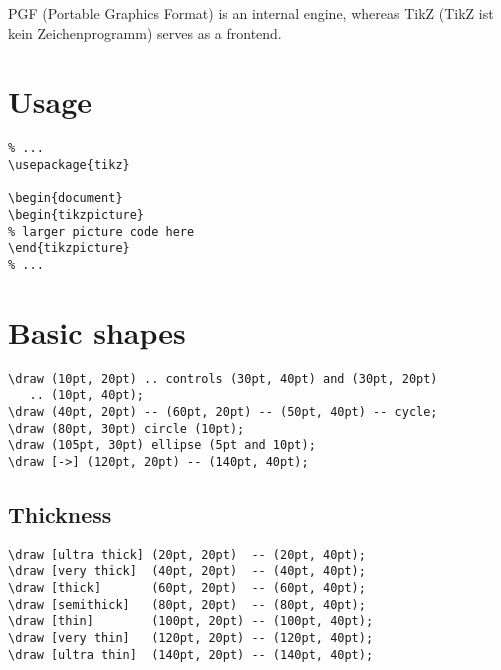 \documentclass[a4paper, twoside, 8pt]{extarticle}
\begin{document}
\renewcommand{\footrulewidth}{0.4pt}

\begin{multicols*}{2}
PGF (Portable Graphics Format) is an internal engine, 
whereas TikZ (TikZ ist kein Zeichenprogramm) serves as a frontend.

\section*{Usage}
\begin{verbatim}
% ...
\usepackage{tikz}

\begin{document}
\begin{tikzpicture}
% larger picture code here
\end{tikzpicture}
% ...
\end{verbatim}

\section*{Basic shapes}
\begin{verbatim}
\draw (10pt, 20pt) .. controls (30pt, 40pt) and (30pt, 20pt) 
   .. (10pt, 40pt);
\draw (40pt, 20pt) -- (60pt, 20pt) -- (50pt, 40pt) -- cycle; 
\draw (80pt, 30pt) circle (10pt);
\draw (105pt, 30pt) ellipse (5pt and 10pt);
\draw [->] (120pt, 20pt) -- (140pt, 40pt);
\end{verbatim}

\begin{center}
\end{center}

\subsection*{Thickness}
\begin{verbatim}
\draw [ultra thick] (20pt, 20pt)  -- (20pt, 40pt);
\draw [very thick]  (40pt, 20pt)  -- (40pt, 40pt);
\draw [thick]       (60pt, 20pt)  -- (60pt, 40pt);
\draw [semithick]   (80pt, 20pt)  -- (80pt, 40pt);
\draw [thin]        (100pt, 20pt) -- (100pt, 40pt);
\draw [very thin]   (120pt, 20pt) -- (120pt, 40pt);
\draw [ultra thin]  (140pt, 20pt) -- (140pt, 40pt);
\end{verbatim}


\end{multicols*}
\end{document}
